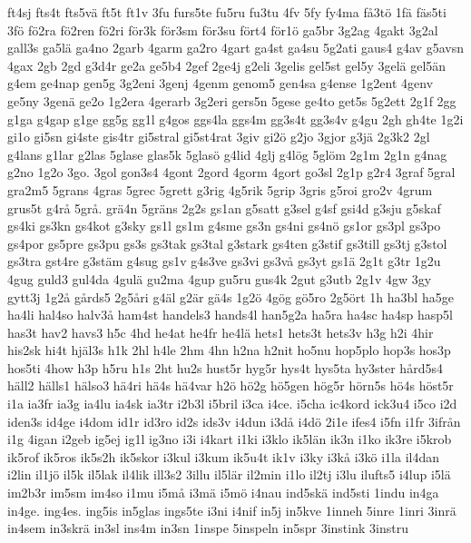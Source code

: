{{ft4sj
fts4t
fts5v^^e4
ft5t
ft1v
3fu
furs5te
fu5ru
fu3tu
4fv
5fy
fy4ma
f^^e53t^^f6
1f^^e4
f^^e4s5ti
3f^^f6
f^^f62ra
f^^f62ren
f^^f62ri
f^^f6r3k
f^^f6r3sm
f^^f6r3su
f^^f6rt4
f^^f6r1^^f6
ga5br
3g2ag
4gakt
3g2al
gall3s
ga5l^^e4
ga4no
2garb
4garm
ga2ro
4gart
ga4st
ga4su
5g2ati
gaus4
g4av
g5avsn
4gax
2gb
2gd
g3d4r
ge2a
ge5b4
2gef
2ge4j
g2eli
3gelis
gel5st
gel5y
3gel^^e4
gel5^^e4n
g4em
ge4nap
gen5g
3g2eni
3genj
4genm
genom5
gen4sa
g4ense
1g2ent
4genv
ge5ny
3gen^^e4
ge2o
1g2era
4gerarb
3g2eri
gers5n
5gese
ge4to
get5s
5g2ett
2g1f
2gg
g1ga
g4gap
g1ge
gg5g
gg1l
g4gos
ggs4la
ggs4m
gg3s4t
gg3s4v
g4gu
2gh
gh4te
1g2i
gi1o
gi5sn
gi4ste
gis4tr
gi5stral
gi5st4rat
3giv
gi2^^f6
g2jo
3gjor
g3j^^e4
2g3k2
2gl
g4lans
g1lar
g2las
5glase
glas5k
5glas^^f6
g4lid
4glj
g4l^^f6g
5gl^^f6m
2g1m
2g1n
g4nag
g2no
1g2o
3go.
3gol
gon3s4
4gont
2gord
4gorm
4gort
go3sl
2g1p
g2r4
3graf
5gral
gra2m5
5grans
4gras
5grec
5grett
g3rig
4g5rik
5grip
3gris
g5roi
gro2v
4grum
grus5t
g4r^^e5
5gr^^e5.
gr^^e44n
5gr^^e4ns
2g2s
gs1an
g5satt
g3sel
g4sf
gsi4d
g3sju
g5skaf
gs4ki
gs3kn
gs4kot
g3sky
gs1l
gs1m
g4sme
gs3n
gs4ni
gs4n^^f6
gs1or
gs3pl
gs3po
gs4por
gs5pre
gs3pu
gs3s
gs3tak
gs3tal
g3stark
gs4ten
g3stif
gs3till
gs3tj
g3stol
gs3tra
gst4re
g3st^^e4m
g4sug
gs1v
g4s3ve
gs3vi
gs3v^^e5
gs3yt
gs1^^e4
2g1t
g3tr
1g2u
4gug
guld3
gul4da
4gul^^e4
gu2ma
4gup
gu5ru
gus4k
2gut
g3utb
2g1v
4gw
3gy
gytt3j
1g2^^e5
g^^e5rds5
2g5^^e5ri
g4^^e4l
g2^^e4r
g^^e44s
1g2^^f6
4g^^f6g
g^^f65ro
2g5^^f6rt
1h
ha3bl
ha5ge
ha4li
hal4so
halv3^^e5
ham4st
handels3
hands4l
han5g2a
ha5ra
ha4sc
ha4sp
hasp5l
has3t
hav2
havs3
h5c
4hd
he4at
he4fr
he4l^^e4
hets1
hets3t
hets3v
h3g
h2i
4hir
his2sk
hi4t
hj^^e4l3s
h1k
2hl
h4le
2hm
4hn
h2na
h2nit
ho5nu
hop5plo
hop3s
hos3p
hos5ti
4how
h3p
h5ru
h1s
2ht
hu2s
hust5r
hyg5r
hys4t
hys5ta
hy3ster
h^^e5rd5s4
h^^e4ll2
h^^e4lls1
h^^e4lso3
h^^e44ri
h^^e44s
h^^e44var
h2^^f6
h^^f62g
h^^f65gen
h^^f6g5r
h^^f6rn5s
h^^f64s
h^^f6st5r
i1a
ia3fr
ia3g
ia4lu
ia4sk
ia3tr
i2b3l
i5bril
i3ca
i4ce.
i5cha
ic4kord
ick3u4
i5co
i2d
iden3s
id4ge
i4dom
id1r
id3ro
id2s
ids3v
i4dun
i3d^^e5
i4d^^f6
2i1e
ifes4
i5fn
i1fr
3ifr^^e5n
i1g
4igan
i2geb
ig5ej
ig1l
ig3no
i3i
i4kart
i1ki
i3klo
ik5l^^e4n
ik3n
i1ko
ik3re
i5krob
ik5rof
ik5ros
ik5s2h
ik5skor
i3kul
i3kum
ik5u4t
ik1v
i3ky
i3k^^e5
i3k^^f6
i1la
il4dan
i2lin
il1j^^f6
il5k
il5lak
il4lik
ill3s2
3illu
il5l^^e4r
il2min
i1lo
il2tj
i3lu
ilufts5
i4lup
i5l^^e4
im2b3r
im5sm
im4so
i1mu
i5m^^e5
i3m^^e4
i5m^^f6
i4nau
ind5sk^^e4
ind5sti
1indu
in4ga
in4ge.
ing4es.
ing5is
in5glas
ings5te
i3ni
i4nif
in5j
in5kve
1inneh
5inre
1inri
3inr^^e4
in4sem
in3skr^^e4
in3sl
ins4m
in3sn
1inspe
5inspeln
in5spr
3instink
3instru
}}
